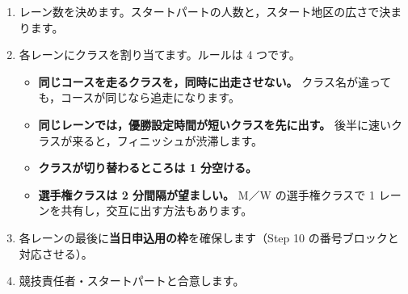 \begin{enumerate}
\item レーン数を決めます。スタートパートの人数と，スタート地区の広さで決まります。
\item 各レーンにクラスを割り当てます。ルールは 4 つです。
  \begin{itemize}
  \item \textbf{同じコースを走るクラスを，同時に出走させない。}
        クラス名が違っても，コースが同じなら追走になります。
  \item \textbf{同じレーンでは，優勝設定時間が短いクラスを先に出す。}
        後半に速いクラスが来ると，フィニッシュが渋滞します。
  \item \textbf{クラスが切り替わるところは 1 分空ける。}
  \item \textbf{選手権クラスは 2 分間隔が望ましい。}
        M／W の選手権クラスで 1 レーンを共有し，交互に出す方法もあります。
  \end{itemize}
\item 各レーンの最後に\textbf{当日申込用の枠}を確保します（Step 10 の番号ブロックと対応させる）。
\item 競技責任者・スタートパートと合意します。
\end{enumerate}

